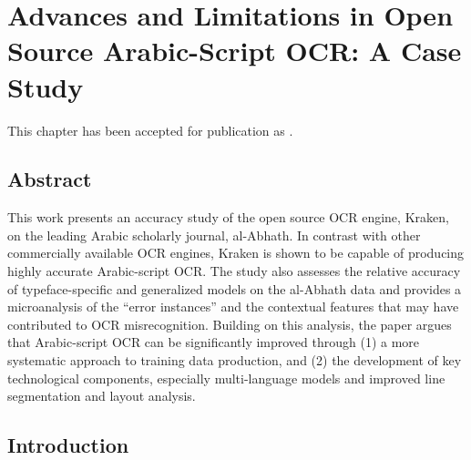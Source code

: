 ﻿\chapter{Advances and Limitations in Open Source Arabic-Script OCR: A Case Study}
\label{ch:champs}
\thispagestyle{empty}
\vfill
This chapter has been accepted for publication as .
\newpage

\section*{Abstract}
This work presents an accuracy study of the open source OCR engine, Kraken, on
the leading Arabic scholarly journal, al-Abhath. In contrast with other
commercially available OCR engines, Kraken is shown to be capable of producing
highly accurate Arabic-script OCR. The study also assesses the relative
accuracy of typeface-specific and generalized models on the al-Abhath data and
provides a microanalysis of the “error instances” and the contextual features
that may have contributed to OCR misrecognition. Building on this analysis, the
paper argues that Arabic-script OCR can be significantly improved through (1) a
more systematic approach to training data production, and (2) the development
of key technological components, especially multi-language models and improved
line segmentation and layout analysis.  

\section{Introduction}

